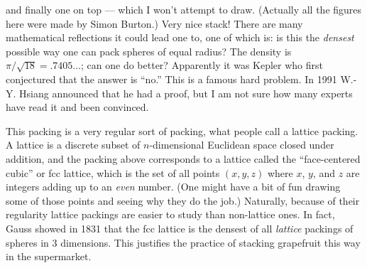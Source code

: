 \documentclass[12pt]{article}
\begin{document}
and finally one on top --- which I won't attempt to draw.  
(Actually all the figures here were made by Simon Burton.)  Very nice
stack! There are many mathematical reflections it could lead one to, one
of which is: is this the \emph{densest} possible way one can pack
spheres of equal radius? The density is \(\pi/\sqrt{18} = .7405\ldots\);
can one do better? Apparently it was Kepler who first conjectured that
the answer is ``no.'' This is a famous hard problem. In 1991 W.-Y.
Hsiang announced that he had a proof, but I am not sure how many experts
have read it and been convinced.

This packing is a very regular sort of packing, what people call a
lattice packing. A lattice is a discrete subset of \(n\)-dimensional
Euclidean space closed under addition, and the packing above corresponds
to a lattice called the ``face-centered cubic'' or fcc lattice, which is
the set of all points \((x,y,z)\) where \(x\), \(y\), and \(z\) are
integers adding up to an \emph{even} number. (One might have a bit of
fun drawing some of those points and seeing why they do the job.)
Naturally, because of their regularity lattice packings are easier to
study than non-lattice ones. In fact, Gauss showed in 1831 that the fcc
lattice is the densest of all \emph{lattice} packings of spheres in 3
dimensions. This justifies the practice of stacking grapefruit this way
in the supermarket.
\end{document}
